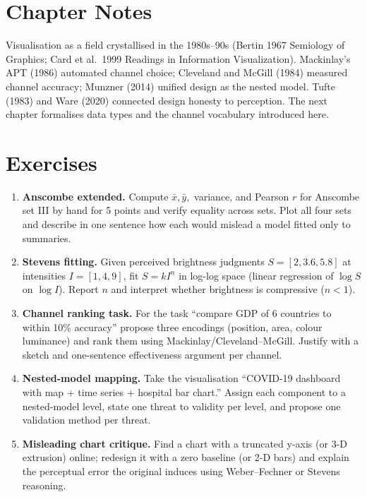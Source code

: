 \section{Chapter Notes}
Visualisation as a field crystallised in the 1980s--90s (Bertin 1967 Semiology of Graphics; Card et al.\ 1999 Readings in Information Visualization). Mackinlay's APT (1986) automated channel choice; Cleveland and McGill (1984) measured channel accuracy; Munzner (2014) unified design as the nested model. Tufte (1983) and Ware (2020) connected design honesty to perception. The next chapter formalises data types and the channel vocabulary introduced here.

\section{Exercises}
\label{sec:ch01-exercises}
\begin{enumerate}[label=E1.\arabic*, leftmargin=*, itemsep=0.8em]
    \item \textbf{Anscombe extended.} Compute $\bar{x},\bar{y},$ variance, and Pearson $r$ for Anscombe set III by hand for 5 points and verify equality across sets. Plot all four sets and describe in one sentence how each would mislead a model fitted only to summaries.
    \item \textbf{Stevens fitting.} Given perceived brightness judgments $S=[2,3.6,5.8]$ at intensities $I=[1,4,9]$, fit $S=kI^{n}$ in log-log space (linear regression of $\log S$ on $\log I$). Report $n$ and interpret whether brightness is compressive ($n<1$).
    \item \textbf{Channel ranking task.} For the task ``compare GDP of 6 countries to within 10\% accuracy'' propose three encodings (position, area, colour luminance) and rank them using Mackinlay/Cleveland--McGill. Justify with a sketch and one-sentence effectiveness argument per channel.
    \item \textbf{Nested-model mapping.} Take the visualisation ``COVID-19 dashboard with map + time series + hospital bar chart.'' Assign each component to a nested-model level, state one threat to validity per level, and propose one validation method per threat.
    \item \textbf{Misleading chart critique.} Find a chart with a truncated y-axis (or 3-D extrusion) online; redesign it with a zero baseline (or 2-D bars) and explain the perceptual error the original induces using Weber--Fechner or Stevens reasoning.
\end{enumerate}

